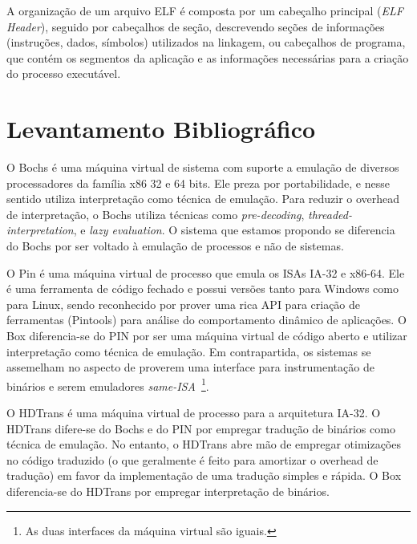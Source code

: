 \documentclass[11pt,twoside]{article}
\begin{document}
A organização de um arquivo ELF é composta por um cabeçalho principal (\emph{ELF Header}), seguido por cabeçalhos de seção, descrevendo seções de informações (instruções, dados, símbolos) utilizados na linkagem, ou cabeçalhos de programa, que contém os segmentos da aplicação e as informações necessárias para a criação do processo executável. 





\section{Levantamento Bibliográfico}  \label{sec:bibliografia}

O Bochs \cite{Lawton1996} é uma máquina virtual de sistema com suporte a emulação de diversos processadores da família x86 32 e 64 bits. 
Ele preza por portabilidade, e nesse sentido utiliza interpretação como técnica de emulação. Para reduzir o overhead de interpretação, o Bochs utiliza técnicas como \emph{pre-decoding}\cite{Magnusson1994}, \emph{threaded-interpretation}\cite{Klint1981}, e \emph{lazy evaluation}\cite{Hookway1997}.
O sistema que estamos propondo se diferencia do Bochs por ser voltado à emulação de processos e não de sistemas.

O Pin \cite{Luk2005} é uma máquina virtual de processo que emula os ISAs IA-32 e x86-64. 
Ele é uma ferramenta de código fechado e possui versões tanto para Windows como para Linux, sendo reconhecido por prover uma rica API para criação de ferramentas (Pintools) para análise do comportamento dinâmico de aplicações. 
O Box diferencia-se do PIN por ser uma máquina virtual de código aberto e utilizar interpretação como técnica de emulação.
Em contrapartida, os sistemas se assemelham no aspecto de proverem uma interface para instrumentação de binários e serem emuladores \emph{same-ISA}~\footnote{As duas interfaces da máquina virtual são iguais.}.

O HDTrans \cite{Sridhar2006} é uma máquina virtual de processo para a arquitetura IA-32.
O HDTrans difere-se do Bochs e do PIN por empregar tradução de binários como técnica de emulação.
No entanto, o HDTrans abre mão de empregar otimizações no código traduzido (o que geralmente é feito para amortizar o overhead de tradução) em favor da implementação de uma tradução simples e rápida.
O Box diferencia-se do HDTrans por empregar interpretação de binários.
\end{document}
